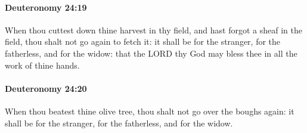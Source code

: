		\paragraph{Deuteronomy 24:19} %
			\label{DEUTERONOMY-24-19}

			When thou cuttest down thine harvest in thy field, and hast forgot a sheaf in the field, thou shalt not go again to fetch it: it shall be for the stranger, for the fatherless, and for the widow: that the LORD thy God may bless thee in all the work of thine hands.


		\paragraph{Deuteronomy 24:20} %
			\label{DEUTERONOMY-24-20}

			When thou beatest thine olive tree, thou shalt not go over the boughs again: it shall be for the stranger, for the fatherless, and for the widow.

